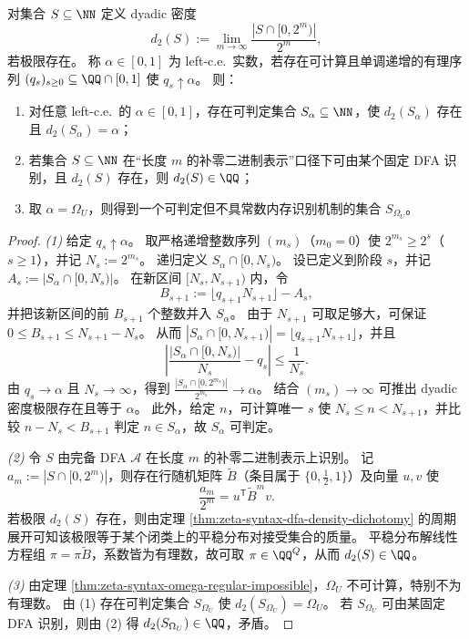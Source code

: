 \begin{theorem}\label{thm:zeta-syntax-leftce-dyadic-density}
对集合 \(S\subseteq\NN\) 定义 dyadic 密度
\[
d_2(S):=\lim_{m\to\infty}\frac{|S\cap[0,2^m)|}{2^m},
\]
若极限存在。
称 \(\alpha\in[0,1]\) 为 left-c.e.\ 实数，若存在可计算且单调递增的有理序列 \((q_s)_{s\ge 0}\subseteq \QQ\cap[0,1]\) 使 \(q_s\uparrow\alpha\)。
则：
\begin{enumerate}
  \item 对任意 left-c.e.\ 的 \(\alpha\in[0,1]\)，存在可判定集合 \(S_\alpha\subseteq\NN\)，使 \(d_2(S_\alpha)\) 存在且 \(d_2(S_\alpha)=\alpha\)；
  \item 若集合 \(S\subseteq\NN\) 在“长度 \(m\) 的补零二进制表示”口径下可由某个固定 DFA 识别，且 \(d_2(S)\) 存在，则 \(d_2(S)\in\QQ\)；
  \item 取 \(\alpha=\Omega_U\)，则得到一个可判定但不具常数内存识别机制的集合 \(S_{\Omega_U}\)。
\end{enumerate}
\end{theorem}
\begin{proof}
\textit{(1)} 给定 \(q_s\uparrow\alpha\)。
取严格递增整数序列 \((m_s)\)（\(m_0=0\)）使 \(2^{m_s}\ge 2^s\)（\(s\ge 1\)），并记 \(N_s:=2^{m_s}\)。
递归定义 \(S_\alpha\cap[0,N_s)\)。
设已定义到阶段 \(s\)，并记 \(A_s:=|S_\alpha\cap[0,N_s)|\)。
在新区间 \([N_s,N_{s+1})\) 内，令
\[
B_{s+1}:=\big\lfloor q_{s+1}N_{s+1}\big\rfloor-A_s,
\]
并把该新区间的前 \(B_{s+1}\) 个整数并入 \(S_\alpha\)。
由于 \(N_{s+1}\) 可取足够大，可保证 \(0\le B_{s+1}\le N_{s+1}-N_s\)。
从而
\(
|S_\alpha\cap[0,N_{s+1})|=\lfloor q_{s+1}N_{s+1}\rfloor
\)，并且
\[
\left|\frac{|S_\alpha\cap[0,N_s)|}{N_s}-q_s\right|\le \frac1{N_s}.
\]
由 \(q_s\to\alpha\) 且 \(N_s\to\infty\)，得到 \(\frac{|S_\alpha\cap[0,2^{m_s})|}{2^{m_s}}\to\alpha\)。
结合 \((m_s)\to\infty\) 可推出 dyadic 密度极限存在且等于 \(\alpha\)。
此外，给定 \(n\)，可计算唯一 \(s\) 使 \(N_s\le n<N_{s+1}\)，并比较 \(n-N_s<B_{s+1}\) 判定 \(n\in S_\alpha\)，故 \(S_\alpha\) 可判定。
\par
\textit{(2)} 令 \(S\) 由完备 DFA \(\mathcal A\) 在长度 \(m\) 的补零二进制表示上识别。
记 \(a_m:=|S\cap[0,2^m)|\)，则存在行随机矩阵 \(\widetilde B\)（条目属于 \(\{0,\tfrac12,1\}\)）及向量 \(u,v\) 使
\[
\frac{a_m}{2^m}=u^{\mathsf T}\widetilde B^m v.
\]
若极限 \(d_2(S)\) 存在，则由定理 \ref{thm:zeta-syntax-dfa-density-dichotomy} 的周期展开可知该极限等于某个闭类上的平稳分布对接受集合的质量。
平稳分布解线性方程组 \(\pi=\pi \widetilde B\)，系数皆为有理数，故可取 \(\pi\in\QQ^{Q}\)，从而 \(d_2(S)\in\QQ\)。
\par
\textit{(3)} 由定理 \ref{thm:zeta-syntax-omega-regular-impossible}，\(\Omega_U\) 不可计算，特别不为有理数。
由 (1) 存在可判定集合 \(S_{\Omega_U}\) 使 \(d_2(S_{\Omega_U})=\Omega_U\)。
若 \(S_{\Omega_U}\) 可由某固定 DFA 识别，则由 (2) 得 \(d_2(S_{\Omega_U})\in\QQ\)，矛盾。
\end{proof}

